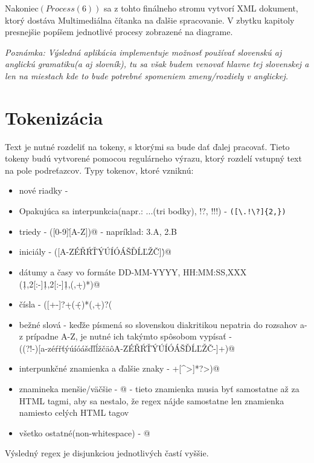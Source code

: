 \documentclass[12pt,a4paper]{report}
\theoremstyle{definition}
\theoremstyle{remark}
\begin{document}
Nakoniec$(Process (6))$ sa z tohto finálneho stromu vytvorí XML dokument, ktorý dostáva Multimediálna čítanka na ďalšie spracovanie. V zbytku kapitoly presnejšie popíšem jednotlivé procesy zobrazené na diagrame.

\textit{Poznámka: Výsledná aplikácia implementuje možnosť používať slovenskú aj anglickú gramatiku(a aj slovník), tu sa však budem venovať hlavne tej slovenskej a len na miestach kde to bude potrebné spomeniem zmeny/rozdiely v anglickej.}
\section{Tokenizácia}
Text je nutné rozdeliť na tokeny, s ktorými sa bude dať ďalej pracovať. Tieto tokeny budú vytvorené pomocou regulárneho výrazu, ktorý rozdelí vstupný text na pole podreťazcov.
\noindent Typy tokenov, ktoré vzniknú:
\begin{itemize}
\item nové riadky - \verb@\n@
\item Opakujúca sa interpunkcia(napr.: ...(tri bodky), !?, !!!) - \verb|([\.!\?]{2,})|
\item triedy - \verb@([0-9]\.[A-Z])@ - napríklad: 3.A, 2.B
\item iniciály - \verb@([A-ZÉŘŔŤÝÚÍÓÁŠĎĹĽŽČ]\.)@
\item dátumy a časy vo formáte DD-MM-YYYY, HH:MM:SS,XXX \\ \verb@(\d{1,2}[:-]\d{1,2}[:-]\d{1,}(,\d+)*)@
\item čísla - \verb@([+-]?\d+(\.\d+)*(,\d+)?(%|,-)?)@ %
\item bežné slová - keďže písmená so slovenskou diakritikou nepatria do rozsahov a-z prípadne A-Z, je nutné ich takýmto spôsobom vypísať - \\ \verb@((?!-)[a-zéŕřťýúíóášďľĺžčäôA-ZÉŘŔŤÝÚÍÓÁŠĎĹĽŽČ-]+)@
\item interpunkčné znamienka a ďalšie znaky - +[^>\n]*?>)@
\item znamineka menšie/väčšie - \verb@[<>]@ - tieto znamienka musia byť samostatne až za HTML tagmi, aby sa nestalo, že regex nájde samostatne len znamienka namiesto celých HTML tagov
\item všetko ostatné(non-whitespace) - \verb@[\S+]@
\end{itemize}

\noindent Výsledný regex je disjunkciou jednotlivých častí vyššie.
\end{document}
